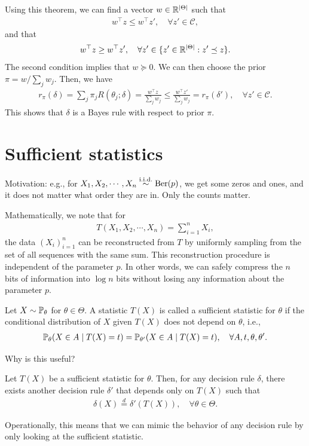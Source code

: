 \documentclass[11pt,letterpaper]{article}
\numberwithin{theorem}{lecture}
\numberwithin{proposition}{lecture}
\numberwithin{lemma}{lecture}
\numberwithin{claim}{lecture}
\numberwithin{corollary}{lecture}
\numberwithin{definition}{lecture}
\numberwithin{conjecture}{lecture}
\numberwithin{remark}{lecture}
\numberwithin{example}{lecture}
\numberwithin{equation}{lecture}
\begin{document}
Using this theorem, we can find a vector $w \in \mathbb{R}^{|\Theta|}$ such that
\begin{align*}
  w^\top z \leq w^\top z', \quad \forall z' \in \mathcal{C},
\end{align*}
and that
\begin{align*}
  w^\top z \geq w^\top z', \quad \forall z' \in \{ z' \in \mathbb{R}^{|\Theta|} : z' \preceq z \}.
\end{align*}
The second condition implies that $w \succeq 0$. We can then choose the prior $\pi = w / \sum_j w_j$. Then, we have
\begin{align*}
  r_\pi (\delta) = \sum_j \pi_j R(\theta_j; \delta) = \frac{w^\top z}{\sum_j w_j} \leq \frac{w^\top z'}{\sum_j w_j} = r_\pi (\delta'), \quad \forall z' \in \mathcal{C}.
\end{align*}
This shows that $\delta$ is a Bayes rule with respect to prior $\pi$.

\section{Sufficient statistics}
Motivation: e.g., for $X_1, X_2, \cdots, X_n \overset{\mathrm{i.i.d.}}{\sim} \mathrm{Ber} (p)$, we get some zeros and ones, and it does not matter what order they are in. Only the counts matter.

Mathematically, we note that for
\begin{align*}
  T (X_1, X_2, \cdots, X_n) = \sum_{i=1}^n X_i,
\end{align*}
the data $(X_i)_{i=1}^n$ can be reconstructed from $T$ by uniformly sampling from the set of all sequences with the same sum. This reconstruction procedure is independent of the parameter $p$.
In other words, we can safely compress the $n$ bits of information into $\log n$ bits without losing any information about the parameter $p$.

\begin{definition}
  Let $X \sim {\mathbb{P}}_\theta$ for $\theta \in \Theta$. A statistic $T(X)$ is called a sufficient statistic for $\theta$ if the conditional distribution of $X$ given $T(X)$ does not depend on $\theta$, i.e.,
  \begin{align*}
    {\mathbb{P}}_\theta (X \in A \mid T(X) = t) = {\mathbb{P}}_{\theta'} (X \in A \mid T(X) = t), \quad \forall A, t, \theta, \theta'.
  \end{align*}
\end{definition}
Why is this useful?
\begin{theorem}
  Let $T(X)$ be a sufficient statistic for $\theta$. Then, for any decision rule $\delta$, there exists another decision rule $\delta'$ that depends only on $T(X)$ such that
  \begin{align*}
    \delta (X) \stackrel{d}{=} \delta' (T(X)), \quad \forall \theta \in \Theta.
  \end{align*}
\end{theorem}
Operationally, this means that we can mimic the behavior of any decision rule by only looking at the sufficient statistic.
\end{document}
